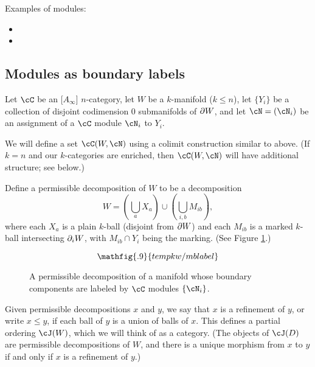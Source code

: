 \medskip

Examples of modules:
\begin{itemize}
\item {}
\item {}
\end{itemize}

\subsection{Modules as boundary labels}
\label{moddecss}

Let $\cC$ be an [$A_\infty$] $n$-category, let $W$ be a $k$-manifold ($k\le n$),
let $\{Y_i\}$ be a collection of disjoint codimension 0 submanifolds of $\partial W$,
and let $\cN = (\cN_i)$ be an assignment of a $\cC$ module $\cN_i$ to $Y_i$.


We will define a set $\cC(W, \cN)$ using a colimit construction similar to above.
(If $k = n$ and our $k$-categories are enriched, then
$\cC(W, \cN)$ will have additional structure; see below.)

Define a permissible decomposition of $W$ to be a decomposition
\[
	W = \left(\bigcup_a X_a\right) \cup \left(\bigcup_{i,b} M_{ib}\right) ,
\]
where each $X_a$ is a plain $k$-ball (disjoint from $\partial W$) and
each $M_{ib}$ is a marked $k$-ball intersecting $\partial_i W$,
with $M_{ib}\cap Y_i$ being the marking.
(See Figure \ref{mblabel}.)
\begin{figure}[!ht]\begin{equation*}
\mathfig{.9}{tempkw/mblabel}
\end{equation*}\caption{A permissible decomposition of a manifold
whose boundary components are labeled by $\cC$ modules $\{\cN_i\}$.}\label{mblabel}\end{figure}
Given permissible decompositions $x$ and $y$, we say that $x$ is a refinement
of $y$, or write $x \le y$, if each ball of $y$ is a union of balls of $x$.
This defines a partial ordering $\cJ(W)$, which we will think of as a category.
(The objects of $\cJ(D)$ are permissible decompositions of $W$, and there is a unique
morphism from $x$ to $y$ if and only if $x$ is a refinement of $y$.)

